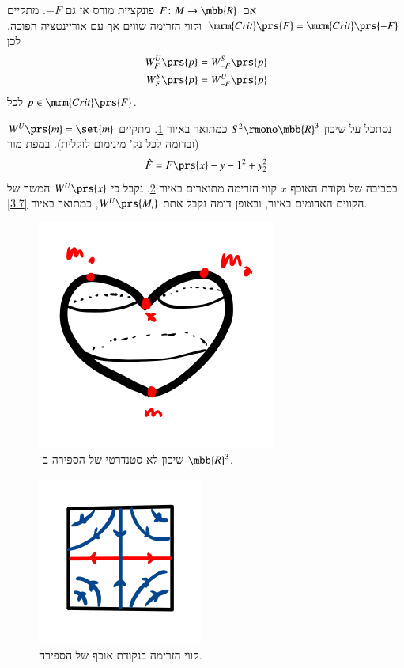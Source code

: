 \documentclass[a4paper,10pt,twoside,openany]{book}
\begin{document}
\begin{remark}
אם
$F \colon M \to \mbb{R}$
פונקציית מורס אז גם
$-F$.
מתקיים
$\mrm{Crit}\prs{F} = \mrm{Crit}\prs{-F}$
וקווי הזרימה שווים אך עם אוריינטציה הפוכה.
לכן
\begin{align*}
W_F^U\prs{p} &= W_{-F}^S\prs{p} \\
W_F^S\prs{p} &= W_{-F}^U\prs{p}
\end{align*}
לכל
$p \in \mrm{Crit}\prs{F}$.
\end{remark}

\begin{definition}
נסתכל על שיכון
$S^2 \rmono \mbb{R}^3$
כמתואר באיור
\ref{3.5}.
מתקיים
$W^U\prs{m} = \set{m}$
(ובדומה לכל נק' מינימום לוקלית).
במפת מור
\[\hat{F} = F\prs{x} - y-1^2 + y_2^2\]
 בסביבה של נקודת האוכף
$x$
קווי הזרימה מתוארים באיור
\ref{3.6}.
נקבל כי
$W^U\prs{x}$
המשך של הקווים האדומים באיור, ובאופן דומה נקבל אתת
$W^U\prs{M_i}$,
כמתואר באיור
\ref{3.7}.
\end{definition}

\begin{figure}
\centering
\includegraphics[scale=0.5]{sources/3.5}
\caption{שיכון לא סטנדרטי של הספירה ב־%
$\mbb{R}^3$.}
\label{3.5}
\end{figure}

\begin{figure}
\centering
\includegraphics[scale=0.5]{sources/3.6}
\caption{קווי הזרימה בנקודת אוכף של הספירה.}
\label{3.6}
\end{figure}
\end{document}
